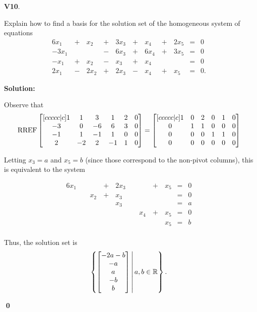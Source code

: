 \documentclass{article}
\newenvironment{problem}[1]
{
  \begin{flushleft}
  \textbf{#1}.
  \ignorespaces
}
{
  \end{flushleft}
}
\newenvironment{solution}
{
  \ignorespaces
  \textbf{Solution:}
}
{
  \ignorespacesafterend
  \begin{flushright}
  {\bfseries \qed}
  \end{flushright}
}
\begin{document}
\begin{problem}{V10}
Explain how to find a basis for the solution set of the homogeneous system of equations
\begin{alignat*}{6}
x_1 &\,+\,& x_2 &\,+\,& 3x_3 &\,+\,& x_4 &\,+\,& 2x_5 &=& 0 \\
-3x_1 &\,\,&  &\,-\,& 6x_3 &\,+\,&6 x_4 &\,+\,& 3x_5 &=& 0 \\
-x_1 &\,+\,& x_2 &\,-\,& x_3 &\,+\,& x_4 &\,\,&  &=& 0 \\
2x_1 &\,-\,& 2x_2 &\,+\,& 2x_3 &\,-\,& x_4 &\,+\,& x_5 &=& 0 .
\end{alignat*}
\end{problem}
\begin{solution}
Observe that
\[ \operatorname{RREF}
    \begin{bmatrix}[ccccc|c]
    1 & 1 & 3 & 1 & 2 & 0\\
    -3 & 0 & -6 & 6 & 3 & 0\\
    -1 & 1 & -1 & 1 & 0 & 0\\
    2 & -2 & 2 & -1 & 1& 0
    \end{bmatrix} =
    \begin{bmatrix}[ccccc|c]
    1 & 0 & 2 & 0 & 1 &0\\
    0 & 1 & 1 & 0 & 0 &0\\
    0 & 0 & 0 & 1 & 1 &0\\
    0 & 0 & 0 & 0 & 0&0
    \end{bmatrix}
\]

Letting \(x_3=a\) and \(x_5=b\)
(since those correspond to the non-pivot columns),
this is equivalent to the system

\begin{alignat*}{6}
x_1 &\,\,&  &\,+\,& 2x_3 &\,\,&  &\,+\,& x_5 &=& 0 \\
 &\,\,& x_2 &\,+\,& x_3 &\,\,& &\,\,&  &=& 0 \\
 &\,\,&  &\,\,& x_3 &\,\,&  &\,\,&  &=& a \\
 &\,\,&  &\,\,&  &\,\,& x_4 &\,+\,& x_5 &=& 0 \\
 &\,\,&  &\,\,&  &\,\,&  &\,\,& x_5 &=& b \\
\end{alignat*}

Thus, the solution set is
\[ \left\{\begin{bmatrix} -2a-b \\ -a \\ a \\ -b \\ b \end{bmatrix}\,\middle|\,a,b \in \mathbb{R}\right\} .\]


\end{solution}
\end{document}
